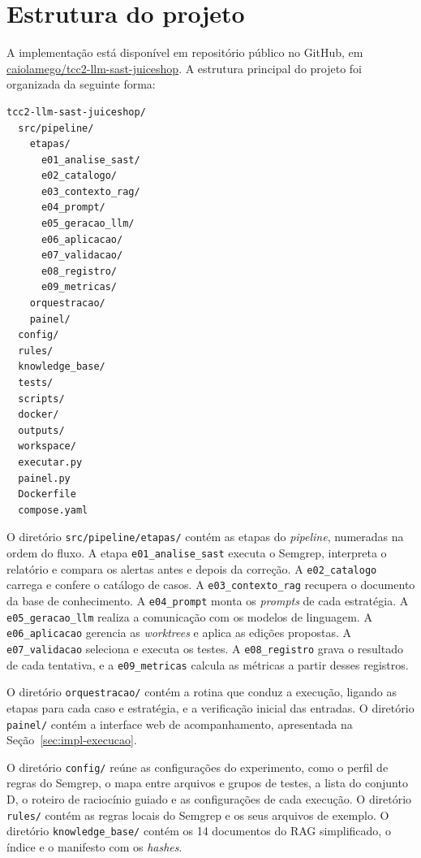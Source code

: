 \section{Estrutura do projeto}
\label{sec:impl-estrutura}

A implementação está disponível em repositório público no GitHub, em \href{https://github.com/caiolamego/tcc2-llm-sast-juiceshop}{caiolamego/tcc2-llm-sast-juiceshop}. A estrutura principal do projeto foi organizada da seguinte forma:

{\footnotesize
\begin{verbatim}
tcc2-llm-sast-juiceshop/
  src/pipeline/
    etapas/
      e01_analise_sast/
      e02_catalogo/
      e03_contexto_rag/
      e04_prompt/
      e05_geracao_llm/
      e06_aplicacao/
      e07_validacao/
      e08_registro/
      e09_metricas/
    orquestracao/
    painel/
  config/
  rules/
  knowledge_base/
  tests/
  scripts/
  docker/
  outputs/
  workspace/
  executar.py
  painel.py
  Dockerfile
  compose.yaml
\end{verbatim}
}

O diretório \texttt{src/pipeline/etapas/} contém as etapas do \textit{pipeline}, numeradas na ordem do fluxo. A etapa \texttt{e01\_analise\_sast} executa o Semgrep, interpreta o relatório e compara os alertas antes e depois da correção. A \texttt{e02\_catalogo} carrega e confere o catálogo de casos. A \texttt{e03\_contexto\_rag} recupera o documento da base de conhecimento. A \texttt{e04\_prompt} monta os \textit{prompts} de cada estratégia. A \texttt{e05\_geracao\_llm} realiza a comunicação com os modelos de linguagem. A \texttt{e06\_aplicacao} gerencia as \textit{worktrees} e aplica as edições propostas. A \texttt{e07\_validacao} seleciona e executa os testes. A \texttt{e08\_registro} grava o resultado de cada tentativa, e a \texttt{e09\_metricas} calcula as métricas a partir desses registros.

O diretório \texttt{orquestracao/} contém a rotina que conduz a execução, ligando as etapas para cada caso e estratégia, e a verificação inicial das entradas. O diretório \texttt{painel/} contém a interface web de acompanhamento, apresentada na Seção~\ref{sec:impl-execucao}.

O diretório \texttt{config/} reúne as configurações do experimento, como o perfil de regras do Semgrep, o mapa entre arquivos e grupos de testes, a lista do conjunto D, o roteiro de raciocínio guiado e as configurações de cada execução. O diretório \texttt{rules/} contém as regras locais do Semgrep e os seus arquivos de exemplo. O diretório \texttt{knowledge\_base/} contém os 14 documentos do RAG simplificado, o índice e o manifesto com os \textit{hashes}.

